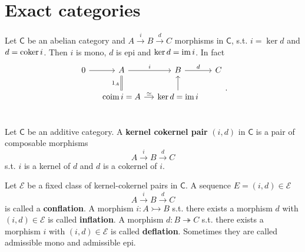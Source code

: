 \section{Exact categories}
\begin{rem}
	Let $\mathsf{C}$ be an abelian category and $A \xrightarrow{i} B \xrightarrow{d} C$ morphisms in $\mathsf{C}$, s.t.
	$i = \ker d$ and $d = \operatorname{coker} i$.
	Then $i$ is mono, $d$ is epi and $\ker d = \operatorname{im} i$.
	In fact 
	\begin{equation}
		\begin{tikzcd}[column sep=small]
		0 \arrow[r, "", rightarrow] &
		A \arrow[r, "i", rightarrow] \arrow[d, "1_A"', equal] &
		B \arrow[r, "d", rightarrow] &
		C \\
		& \mathrm{coim}\, i = A \arrow[r, "\simeq", rightarrow] &
		\ker d = \ima i \arrow[u, "", rightarrow] & \\
	\end{tikzcd}
	.\end{equation} 
\end{rem}

\begin{defn}
	Let $\mathsf{C}$ be an additive category.
	A \textbf{kernel cokernel pair} $\left(i, d\right)$ in $\mathsf{C}$ is a pair of composable morphisms
	\begin{equation}
	A \xrightarrow{i} B \xrightarrow{d} C
	\end{equation} 
	s.t. $i$ is a kernel of $d$ and $d$ is a cokernel of $i$.
\end{defn}

\begin{defn}
	Let $\mathcal{E}$ be a fixed class of kernel-cokernel pairs in $\mathsf{C}$.
	A sequence $E = \left(i, d\right) \in \mathcal{E}$
	\begin{equation}
	A \xrightarrow{i} B \xrightarrow{d} C
	\end{equation} 
	is called a \textbf{conflation}.
	A morphism $i: A \rightarrowtail B$ s.t. there exists a morphism $d$ with $\left(i, d\right) \in \mathcal{E}$ is called \textbf{inflation}.
	A morphism $d: B \twoheadrightarrow C$ s.t. there exists a morphism $i$ with $\left(i, d\right) \in \mathcal{E}$ is called \textbf{deflation}.
	Sometimes they are called admissible mono and admissible epi.
\end{defn}

